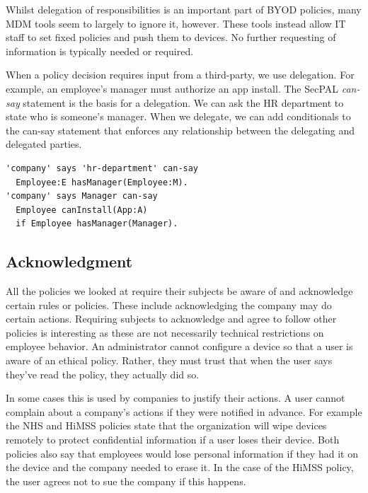 \documentclass[thesis.tex]{subfiles}
\begin{document}
Whilst delegation of responsibilities is an important
part of BYOD policies, many MDM tools seem to largely to ignore it,
however.  These tools instead allow IT staff to set fixed policies and
push them to devices.  No further requesting of information is
typically needed or required.

When a policy decision requires input from a third-party, we use delegation.
For example, an employee's manager must authorize an app install.
The SecPAL \emph{can-say} statement is the basis for a delegation.
We can ask the HR department to state who is someone's manager.
When we delegate, we can add conditionals to the can-say
statement that enforces any relationship between the delegating and
delegated parties.

\noindent\begin{minipage}{\linewidth}\vspace{1em}
\begin{lstlisting}
'company' says 'hr-department' can-say
  Employee:E hasManager(Employee:M).
'company' says Manager can-say
  Employee canInstall(App:A)
  if Employee hasManager(Manager).
\end{lstlisting}
\end{minipage}

\subsection{Acknowledgment}

All the policies we looked at require their subjects be aware of and acknowledge
certain rules or policies. These include acknowledging the company may do
certain actions. Requiring subjects to acknowledge and agree to follow other
policies is interesting as these are not necessarily technical restrictions on
employee behavior. An administrator cannot configure a device so that a user is
aware of an ethical policy. Rather, they must trust that when the
user says they've read the policy, they actually did so.

In some cases this is used by companies to justify their actions.  A
user cannot complain about a company's actions if they were notified
in advance.  For example the NHS and \ac{HiMSS} policies state that
the organization will wipe devices remotely to protect confidential
information if a user loses their device.  Both policies also say that
employees would lose personal information if they had it on the device
and the company needed to erase it.  In the case of the \ac{HiMSS} policy, the user agrees not to
sue the company if this happens.
\end{document}
